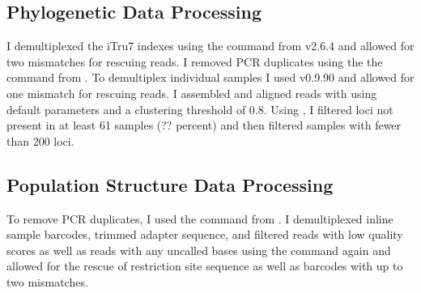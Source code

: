 \subsection{Phylogenetic Data Processing}
I demultiplexed the iTru7 indexes using the \processradtags command from 
\stacks v2.6.4 \parencites{rochette2019} and allowed for two mismatches for 
rescuing reads.
I removed PCR duplicates using the the \clonefilter command from \stacks.
To demultiplex individual samples I used \pyrad v0.9.90 and allowed for one 
mismatch for rescuing reads. 
I assembled and aligned reads with \pyrad using default parameters and a 
clustering threshold of 0.8. 
Using \pyrad, I filtered loci not present in at least 61 samples (?? percent)
and then filtered samples with fewer than 200 loci.



\subsection{Population Structure Data Processing}
To remove PCR duplicates, I used the \clonefilter command from \stacks.
I demultiplexed inline sample barcodes, trimmed adapter sequence, and filtered 
reads with low quality scores as well as reads with any uncalled bases using the  
\processradtags command again and allowed for the rescue of restriction site sequence 
as well as barcodes with up to two mismatches.  







